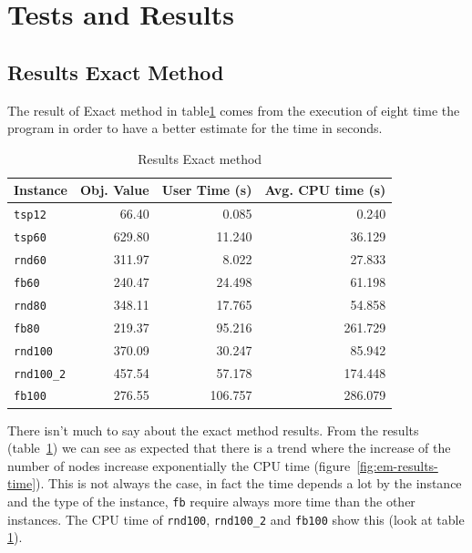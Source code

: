 \section{Tests and Results}

\subsection{Results Exact Method}
	The result of Exact method in table\ref{tab:ExactMethodResults} comes from the execution of eight time the program in order to have a better estimate for the time in seconds.

	\begin{table}[h]
		\centering
		\begin{tabular}{lrrr}
			\toprule
			\textbf{Instance} & \textbf{Obj. Value} & \textbf{User Time (s)} & \textbf{Avg. CPU time (s)} \\
			\midrule
			\verb|tsp12| & 66.40 & 0.085 & 0.240 \\
			\verb|tsp60| & 629.80 & 11.240 & 36.129 \\
			\verb|rnd60| & 311.97 & 8.022 & 27.833 \\
			\verb|fb60|	& 240.47 & 24.498 & 61.198 \\
			\verb|rnd80| & 348.11 & 17.765 & 54.858 \\
			\verb|fb80| & 219.37 & 95.216 & 261.729 \\
			\verb|rnd100| & 370.09 & 30.247 & 85.942 \\
			\verb|rnd100_2| & 457.54 & 57.178 & 174.448 \\
			\verb|fb100| & 276.55 & 106.757 & 286.079 \\
			\bottomrule
		\end{tabular}
		\caption{\label{tab:ExactMethodResults} Results Exact method}
	\end{table}

	There isn't much to say about the exact method results. From the results (table~\ref{tab:ExactMethodResults}) we can see as expected that there is a trend where the increase of the number of nodes increase exponentially the CPU time (figure~\ref{fig:em-results-time}). This is not always the case, in fact the time depends a lot by the instance and the type of the instance, \verb|fb| require always more time than the other instances. The CPU time of \verb|rnd100|, \verb|rnd100_2| and \verb|fb100| show this (look at table \ref{tab:ExactMethodResults}).

